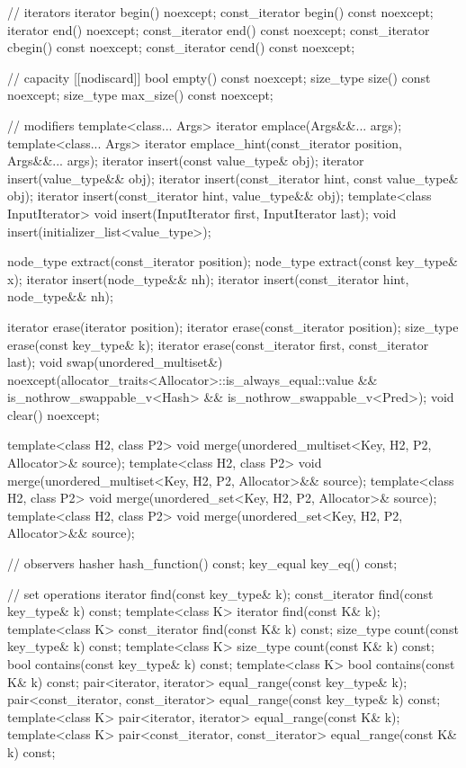 \begin{codeblock}
{{    // iterators
    iterator       begin() noexcept;
    const_iterator begin() const noexcept;
    iterator       end() noexcept;
    const_iterator end() const noexcept;
    const_iterator cbegin() const noexcept;
    const_iterator cend() const noexcept;

    // capacity
    [[nodiscard]] bool empty() const noexcept;
    size_type size() const noexcept;
    size_type max_size() const noexcept;

    // modifiers
    template<class... Args> iterator emplace(Args&&... args);
    template<class... Args> iterator emplace_hint(const_iterator position, Args&&... args);
    iterator insert(const value_type& obj);
    iterator insert(value_type&& obj);
    iterator insert(const_iterator hint, const value_type& obj);
    iterator insert(const_iterator hint, value_type&& obj);
    template<class InputIterator> void insert(InputIterator first, InputIterator last);
    void insert(initializer_list<value_type>);

    node_type extract(const_iterator position);
    node_type extract(const key_type& x);
    iterator insert(node_type&& nh);
    iterator insert(const_iterator hint, node_type&& nh);

    iterator  erase(iterator position);
    iterator  erase(const_iterator position);
    size_type erase(const key_type& k);
    iterator  erase(const_iterator first, const_iterator last);
    void      swap(unordered_multiset&)
      noexcept(allocator_traits<Allocator>::is_always_equal::value &&
               is_nothrow_swappable_v<Hash> &&
               is_nothrow_swappable_v<Pred>);
    void      clear() noexcept;

    template<class H2, class P2>
      void merge(unordered_multiset<Key, H2, P2, Allocator>& source);
    template<class H2, class P2>
      void merge(unordered_multiset<Key, H2, P2, Allocator>&& source);
    template<class H2, class P2>
      void merge(unordered_set<Key, H2, P2, Allocator>& source);
    template<class H2, class P2>
      void merge(unordered_set<Key, H2, P2, Allocator>&& source);

    // observers
    hasher hash_function() const;
    key_equal key_eq() const;

    // set operations
    iterator         find(const key_type& k);
    const_iterator   find(const key_type& k) const;
    template<class K>
      iterator       find(const K& k);
    template<class K>
      const_iterator find(const K& k) const;
    size_type        count(const key_type& k) const;
    template<class K>
      size_type      count(const K& k) const;
    bool             contains(const key_type& k) const;
    template<class K>
      bool           contains(const K& k) const;
    pair<iterator, iterator>               equal_range(const key_type& k);
    pair<const_iterator, const_iterator>   equal_range(const key_type& k) const;
    template<class K>
      pair<iterator, iterator>             equal_range(const K& k);
    template<class K>
      pair<const_iterator, const_iterator> equal_range(const K& k) const;

}}
\end{codeblock}
